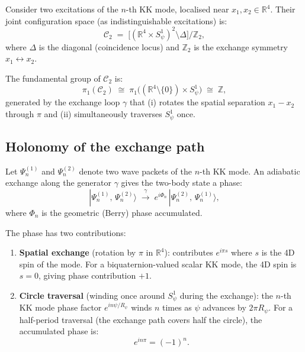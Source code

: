 \documentclass[11pt,a4paper]{article}
\begin{document}
Consider two excitations of the $n$-th KK mode, localised near
$x_1, x_2\in\mathbb{R}^4$.  Their joint configuration space (as
indistinguishable excitations) is:
\begin{equation}
  \mathcal{C}_2 \;=\;
  \bigl[(\mathbb{R}^4\times S^1_\psi)^2 \setminus \Delta\bigr]\big/ \mathbb{Z}_2,
\end{equation}
where $\Delta$ is the diagonal (coincidence locus) and $\mathbb{Z}_2$ is the
exchange symmetry $x_1\leftrightarrow x_2$.

The fundamental group of $\mathcal{C}_2$ is:
\begin{equation}
\label{eq:pi1}
  \pi_1(\mathcal{C}_2)
  \;\cong\;
  \pi_1\!\bigl((\mathbb{R}^4\setminus\{0\})\times S^1_\psi\bigr)
  \;\cong\;
  \mathbb{Z},
\end{equation}
generated by the exchange loop $\gamma$ that (i) rotates the spatial separation
$x_1-x_2$ through $\pi$ and (ii) simultaneously traverses $S^1_\psi$ once.

\subsection{Holonomy of the exchange path}

Let $\Psi^{(1)}_n$ and $\Psi^{(2)}_n$ denote two wave packets of the $n$-th
KK mode.  An adiabatic exchange along the generator $\gamma$ gives the two-body
state a phase:
\begin{equation}
\label{eq:exchange_phase}
  |\Psi^{(1)}_n,\,\Psi^{(2)}_n\rangle
  \;\xrightarrow{\gamma}\;
  e^{i\Phi_n}\,
  |\Psi^{(2)}_n,\,\Psi^{(1)}_n\rangle,
\end{equation}
where $\Phi_n$ is the geometric (Berry) phase accumulated.

The phase has two contributions:
\begin{enumerate}
  \item \textbf{Spatial exchange} (rotation by $\pi$ in $\mathbb{R}^4$):
    contributes $e^{i\pi s}$ where $s$ is the 4D spin of the mode.
    For a biquaternion-valued scalar KK mode, the 4D spin is $s=0$, giving
    phase contribution $+1$.
  \item \textbf{Circle traversal} (winding once around $S^1_\psi$ during
    the exchange): the $n$-th KK mode phase factor $e^{in\psi/R_\psi}$
    winds $n$ times as $\psi$ advances by $2\pi R_\psi$.  For a half-period
    traversal (the exchange path covers half the circle), the accumulated
    phase is:
    \begin{equation}
    \label{eq:circle_phase}
      e^{in\pi} = (-1)^n.
    \end{equation}
\end{enumerate}
\end{document}
